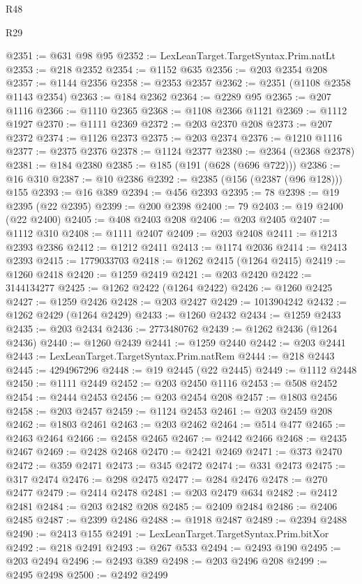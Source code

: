 \begin{lexlean}{R48}
\begin{lexlean}{R29}
\begin{coremodule}
{{{{{{{{{{{{{{{{{{{{{{{{{{{{{{{{{{{{{{{{{{{{{{{{{{{{{{{{{{{{{{{{{{{{{{{{{{{{{{{{{{{{{{{{{{{{{{{{{{{{{{{{{{{{{{{{{{{{{{{{{{{{{{{{{{{{{{{{{{{{{{{{{{{{{{{{{{{{{{{{{{{{{{{{{{{{{{{{{{{{{{{{{{{{{{{{{{{{{{{{{{{{{{{{{{{{{{{{{{@2351 := @631 @98 @95
@2352 := LexLeanTarget.TargetSyntax.Prim.natLt
@2353 := @218 @2352
@2354 := @1152 @635
@2356 := @203 @2354 @208
@2357 := @1144 @2356
@2358 := @2353 @2357
@2362 := @2351 (@1108 @2358 @1143 @2354)
@2363 := @184 @2362
@2364 := @2289 @95
@2365 := @207 @1116
@2366 := @1110 @2365
@2368 := @1108 @2366 @1121
@2369 := @1112 @1927
@2370 := @1111 @2369
@2372 := @203 @2370 @208
@2373 := @207 @2372
@2374 := @1126 @2373
@2375 := @203 @2374
@2376 := @1210 @1116
@2377 := @2375 @2376
@2378 := @1124 @2377
@2380 := @2364 (@2368 @2378)
@2381 := @184 @2380
@2385 := @185 (@191 (@628 (@696 @722)))
@2386 := @16 @310
@2387 := @10 @2386
@2392 := @2385 (@156 (@2387 (@96 @128))) @155
@2393 := @16 @389
@2394 := @456 @2393
@2395 := 78
@2398 := @19 @2395 (@22 @2395)
@2399 := @200 @2398
@2400 := 79
@2403 := @19 @2400 (@22 @2400)
@2405 := @408 @2403 @208
@2406 := @203 @2405
@2407 := @1112 @310
@2408 := @1111 @2407
@2409 := @203 @2408
@2411 := @1213 @2393 @2386
@2412 := @1212 @2411
@2413 := @1174 @2036
@2414 := @2413 @2393
@2415 := 1779033703
@2418 := @1262 @2415 (@1264 @2415)
@2419 := @1260 @2418
@2420 := @1259 @2419
@2421 := @203 @2420
@2422 := 3144134277
@2425 := @1262 @2422 (@1264 @2422)
@2426 := @1260 @2425
@2427 := @1259 @2426
@2428 := @203 @2427
@2429 := 1013904242
@2432 := @1262 @2429 (@1264 @2429)
@2433 := @1260 @2432
@2434 := @1259 @2433
@2435 := @203 @2434
@2436 := 2773480762
@2439 := @1262 @2436 (@1264 @2436)
@2440 := @1260 @2439
@2441 := @1259 @2440
@2442 := @203 @2441
@2443 := LexLeanTarget.TargetSyntax.Prim.natRem
@2444 := @218 @2443
@2445 := 4294967296
@2448 := @19 @2445 (@22 @2445)
@2449 := @1112 @2448
@2450 := @1111 @2449
@2452 := @203 @2450 @1116
@2453 := @508 @2452
@2454 := @2444 @2453
@2456 := @203 @2454 @208
@2457 := @1803 @2456
@2458 := @203 @2457
@2459 := @1124 @2453
@2461 := @203 @2459 @208
@2462 := @1803 @2461
@2463 := @203 @2462
@2464 := @514 @477
@2465 := @2463 @2464
@2466 := @2458 @2465
@2467 := @2442 @2466
@2468 := @2435 @2467
@2469 := @2428 @2468
@2470 := @2421 @2469
@2471 := @373 @2470
@2472 := @359 @2471
@2473 := @345 @2472
@2474 := @331 @2473
@2475 := @317 @2474
@2476 := @298 @2475
@2477 := @284 @2476
@2478 := @270 @2477
@2479 := @2414 @2478
@2481 := @203 @2479 @634
@2482 := @2412 @2481
@2484 := @203 @2482 @208
@2485 := @2409 @2484
@2486 := @2406 @2485
@2487 := @2399 @2486
@2488 := @1918 @2487
@2489 := @2394 @2488
@2490 := @2413 @155
@2491 := LexLeanTarget.TargetSyntax.Prim.bitXor
@2492 := @218 @2491
@2493 := @267 @533
@2494 := @2493 @190
@2495 := @203 @2494
@2496 := @2493 @389
@2498 := @203 @2496 @208
@2499 := @2495 @2498
@2500 := @2492 @2499
}}}}}}}}}}}}}}}}}}}}}}}}}}}}}}}}}}}}}}}}}}}}}}}}}}}}}}}}}}}}}}}}}}}}}}}}}}}}}}}}}}}}}}}}}}}}}}}}}}}}}}}}}}}}}}}}}}}}}}}}}}}}}}}}}}}}}}}}}}}}}}}}}}}}}}}}}}}}}}}}}}}}}}}}}}}}}}}}}}}}}}}}}}}}}}}}}}}}}}}}}}}}}}}}}}}}}}}}}}
\end{coremodule}
\end{lexlean}
\end{lexlean}

